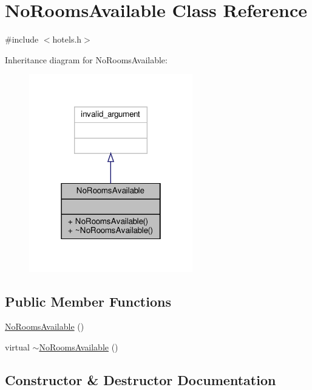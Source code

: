 \hypertarget{class_no_rooms_available}{}\section{No\+Rooms\+Available Class Reference}
\label{class_no_rooms_available}


{\ttfamily \#include $<$hotels.\+h$>$}



Inheritance diagram for No\+Rooms\+Available\+:\nopagebreak
\begin{figure}[H]
\begin{center}
\leavevmode
\includegraphics[width=202pt]{class_no_rooms_available__inherit__graph}
\end{center}
\end{figure}
\subsection*{Public Member Functions}
\begin{DoxyCompactItemize}
\item 
\hyperlink{class_no_rooms_available_a16729d574cc4d2c25e5e00b7672a44bd}{No\+Rooms\+Available} ()
\item 
virtual \hyperlink{class_no_rooms_available_af059ca2ab2857824276a1c16426ac13e}{$\sim$\+No\+Rooms\+Available} ()
\end{DoxyCompactItemize}


\subsection{Constructor \& Destructor Documentation}
\mbox{\label{class_no_rooms_available_a16729d574cc4d2c25e5e00b7672a44bd}} 
